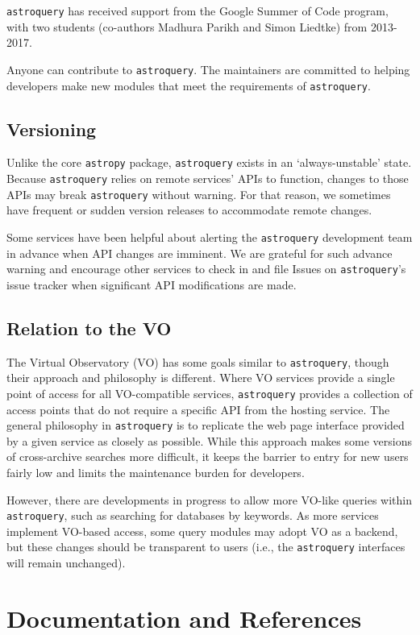 \documentclass[twocolumn]{aastex61}
\newcommand{\package}[1]{\texttt{#1}\xspace}
\newcommand{\astroquery}{\package{astroquery}}
\newcommand{\astropypkg}{\package{astropy}}
\begin{document}
\astroquery has received support from the Google Summer of Code
program, with two students (co-authors Madhura Parikh and Simon Liedtke)
from 2013-2017.

Anyone can contribute to \astroquery.  The maintainers are committed to helping
developers make new modules that meet the requirements of \astroquery.

\subsection{Versioning}
Unlike the core \astropypkg package, \astroquery exists in an `always-unstable' state.
Because \astroquery relies on remote services' APIs to function, changes to those
APIs may break \astroquery without warning.  For that reason, we sometimes have
frequent or sudden version releases to accommodate remote changes.

Some services have been helpful about alerting the \astroquery development team
in advance when API changes are imminent.  We are grateful for such advance
warning and encourage other services to check in and file Issues on \astroquery's
issue tracker when significant API modifications are made.

\subsection{Relation to the VO}

The Virtual Observatory (VO) has some goals similar to \astroquery,
though their approach and philosophy is different.  Where VO services provide a
single point of access for all VO-compatible services, \astroquery
provides a collection of access points that do not require a specific API from
the hosting service.  The general philosophy in \astroquery is to
replicate the web page interface provided by a given service as closely as
possible.  While this approach makes some versions of cross-archive searches
more difficult, it keeps the barrier to entry for new users fairly low and limits
the maintenance burden for developers.

However, there are developments in progress to allow more VO-like queries
within \astroquery, such as searching for databases by keywords.  As more
services implement VO-based access, some query modules may adopt VO as a backend,
but these changes should be transparent to users (i.e., the \astroquery
interfaces will remain unchanged).

\section{Documentation and References}
\end{document}
